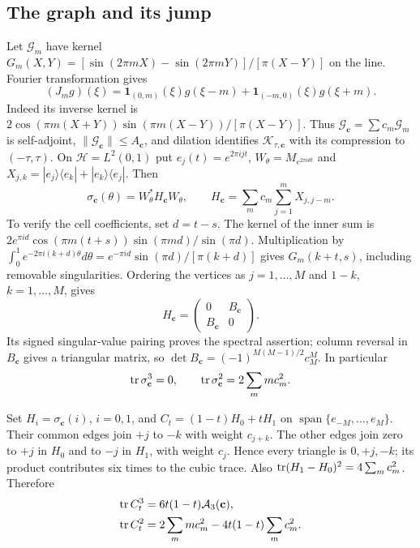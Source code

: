 \subsection{The graph and its jump}
Let $\mathcal G_m$ have kernel
$G_m(X,Y)=[\sin(2\pi mX)-\sin(2\pi mY)]/[\pi(X-Y)]$ on the line.
Fourier transformation gives
\begin{equation}\label{mf:eq:exchange}
 (J_mg)(\xi)=\mathbf1_{(0,m)}(\xi)g(\xi-m)
              +\mathbf1_{(-m,0)}(\xi)g(\xi+m).
\end{equation}
Indeed its inverse kernel is
$2\cos(\pi m(X+Y))\sin(\pi m(X-Y))/[\pi(X-Y)]$.
Thus $\mathcal G_{\mathbf c}=\sum c_m\mathcal G_m$ is self-adjoint,
$\|\mathcal G_{\mathbf c}\|\le A_{\mathbf c}$, and dilation identifies
$\mathcal K_{\tau,\mathbf c}$ with its compression to $(-\tau,\tau)$.
On $\mathscr H=L^2(0,1)$ put $e_j(t)=e^{2\pi ijt}$,
$W_\theta=M_{e^{2\pi i\theta t}}$ and
$X_{j,k}=|e_j\rangle\langle e_k|+|e_k\rangle\langle e_j|$. Then
\begin{equation}\label{mf:eq:bloch}
 \sigma_{\mathbf c}(\theta)=W_\theta^*H_{\mathbf c}W_\theta,
 \qquad H_{\mathbf c}=\sum_m c_m\sum_{j=1}^m X_{j,j-m}.
\end{equation}
To verify the cell coefficients, set $d=t-s$. The kernel of the inner
sum is $2e^{\pi id}\cos(\pi m(t+s))\sin(\pi md)/\sin(\pi d)$.
Multiplication by
$\int_0^1e^{-2\pi i(k+d)\theta}d\theta
=e^{-\pi id}\sin(\pi d)/[\pi(k+d)]$ gives $G_m(k+t,s)$,
including removable singularities.
Ordering the vertices as $j=1,\ldots,M$ and $1-k$, $k=1,\ldots,M$, gives
\begin{equation}\label{mf:eq:block-graph}
 H_{\mathbf c}=\begin{pmatrix}0&B_{\mathbf c}\\B_{\mathbf c}&0\end{pmatrix}.
\end{equation}
Its signed singular-value pairing proves the spectral assertion;
column reversal in $B_{\mathbf c}$ gives a triangular matrix, so
$\det B_{\mathbf c}=(-1)^{M(M-1)/2}c_M^M$. In particular
\begin{equation}\label{mf:eq:bulk-moments}
 \operatorname{tr}\sigma_{\mathbf c}^3=0,\qquad
 \operatorname{tr}\sigma_{\mathbf c}^2=2\sum_m m c_m^2.
\end{equation}

Set $H_i=\sigma_{\mathbf c}(i)$, $i=0,1$, and
$C_t=(1-t)H_0+tH_1$ on $\operatorname{span}\{e_{-M},\ldots,e_M\}$.
Their common edges join $+j$ to $-k$ with weight $c_{j+k}$.
The other edges join zero to $+j$ in $H_0$ and to $-j$ in $H_1$,
with weight $c_j$. Hence every triangle is $0,+j,-k$;
its product contributes six times to the cubic trace. Also
$\operatorname{tr}(H_1-H_0)^2=4\sum_m c_m^2$. Therefore
\begin{align}
 \operatorname{tr} C_t^3&=6t(1-t)\mathcal A_3(\mathbf c),\label{mf:eq:seam-cubic}\\
 \operatorname{tr} C_t^2&=2\sum_m m c_m^2-4t(1-t)\sum_m c_m^2.
 \label{mf:eq:seam-quadratic}
\end{align}


